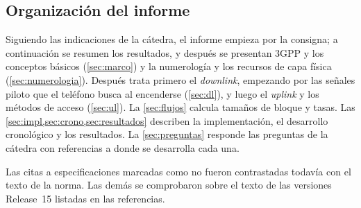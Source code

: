 \subsection{Organización del informe}
Siguiendo las indicaciones de la cátedra, el informe empieza por la consigna; a continuación se resumen los resultados, y después se presentan 3GPP y los conceptos básicos (\cref{sec:marco}) y la numerología y los recursos de capa física (\cref{sec:numerologia}). Después trata primero el \emph{downlink}, empezando por las señales piloto que el teléfono busca al encenderse (\cref{sec:dl}), y luego el \emph{uplink} y los métodos de acceso (\cref{sec:ul}). La \cref{sec:flujos} calcula tamaños de bloque y tasas. Las \cref{sec:impl,sec:crono,sec:resultados} describen la implementación, el desarrollo cronológico y los resultados. La \cref{sec:preguntas} responde las preguntas de la cátedra con referencias a donde se desarrolla cada una.

Las citas a especificaciones marcadas como \verif{} no fueron contrastadas todavía con el texto de la norma. Las demás se comprobaron sobre el texto de las versiones Release~15 listadas en las referencias.
